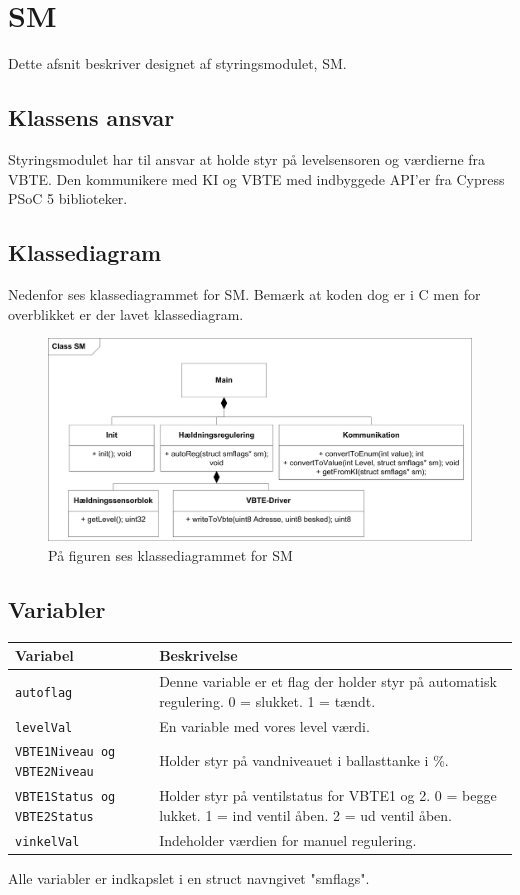 \chapter{SM}
Dette afsnit beskriver designet af styringsmodulet, SM.
\section{Klassens ansvar}
Styringsmodulet har til ansvar at holde styr på levelsensoren og værdierne fra VBTE. Den kommunikere med KI og VBTE med indbyggede API'er fra Cypress PSoC 5 biblioteker. 
\section{Klassediagram}
Nedenfor ses klassediagrammet for SM. Bemærk at koden dog er i C men for overblikket er der lavet klassediagram.
\begin{figure}[H]
\centering
\includegraphics[width=1\textwidth]{billeder/smKlassediagram}
\caption{På figuren ses klassediagrammet for SM}
\end{figure}
\section{Variabler}
\begin{table}[H]
\begin{tabular}{|l|p{10cm}|}
\hline
\cellcolor[gray]{0.8}\textbf{Variabel} &\cellcolor[gray]{0.8} \textbf{Beskrivelse}\\ \hline
\texttt{autoflag} & Denne variable er et flag der holder styr på automatisk regulering. 0 = slukket. 1 = tændt.\\ \hline
\texttt{levelVal} & En variable med vores level værdi.\\ \hline
\texttt{VBTE1Niveau og VBTE2Niveau} & Holder styr på vandniveauet i ballasttanke i \%. \\ \hline
\texttt{VBTE1Status og VBTE2Status} & Holder styr på ventilstatus for  VBTE1 og 2. 0 = begge lukket. 1 = ind ventil åben. 2 = ud ventil åben.\\ \hline
\texttt{vinkelVal} & Indeholder værdien for manuel regulering.\\ \hline
\end{tabular}
\end{table}
Alle variabler er indkapslet i en struct navngivet "smflags".
